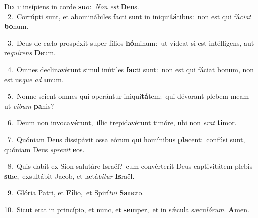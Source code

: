 \lettrine{\initial\textcolor{\initialcolor}{D}}{ixit} insípiens in corde \textbf{su}\-o:~\star \textit{Non} \textit{est} \textbf{De}\-us.\\
{\numbfont\textcolor{\numbcolor}{~2.}}~Corrúpti sunt, et abominábiles facti sunt in iniqui\-\textbf{tá}\-tibus:~\star non est qui fá\-\textit{ci}\-\textit{at} \textbf{bo}\-num.\par
{\numbfont\textcolor{\numbcolor}{~3.}}~Deus de cælo prospéxit super fílios \textbf{hó}\-minum:~\star ut vídeat si est intélligens, aut re\-\textit{quí}\-\textit{rens} \textbf{De}\-um.\par
{\numbfont\textcolor{\numbcolor}{~4.}}~Omnes declinavérunt simul inútiles \textbf{fac}\-ti sunt:~\star non est qui fáciat bonum, non est us\textit{que} \textit{ad} \textbf{u}\-num.\par
{\numbfont\textcolor{\numbcolor}{~5.}}~Nonne scient omnes qui operántur iniqui\-\textbf{tá}\-tem:~\star qui dévorant plebem meam ut \textit{ci}\-\textit{bum} \textbf{pa}\-nis?\par
{\numbfont\textcolor{\numbcolor}{~6.}}~Deum non invoca\-\textbf{vé}\-runt,~\star illic trepidavérunt timóre, ubi non \textit{e}\-\textit{rat} \textbf{ti}\-mor.\par
{\numbfont\textcolor{\numbcolor}{~7.}}~Quóniam Deus dissipávit ossa eórum qui homínibus \textbf{pla}\-cent:~\star confúsi sunt, quóniam Deus \textit{spre}\-\textit{vit} \textbf{e}\-os.\par
{\numbfont\textcolor{\numbcolor}{~8.}}~Quis dabit ex Sion salutáre Israël?~\dagger cum convérterit Deus captivitátem plebis \textbf{su}\-æ,~\star exsultábit Jacob, et lætá\-\textit{bi}\-\textit{tur} \textbf{Is}\-raël.\par
{\numbfont\textcolor{\numbcolor}{~9.}}~Glória Patri, et \textbf{Fí}\-lio,~\star et Spirí\-\textit{tu}\-\textit{i} \textbf{Sanc}\-to.\par
{\numbfont\textcolor{\numbcolor}{10.}}~Sicut erat in princípio, et nunc, et \textbf{sem}\-per,~\star et in sǽcula sæcu\-\textit{ló}\-\textit{rum}. \textbf{A}\-men.\par
